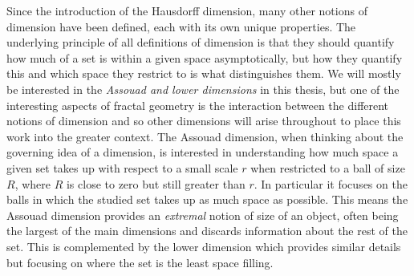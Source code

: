 Since the introduction of the Hausdorff dimension, many other notions of dimension have been defined, each with its own unique properties. The underlying principle of all definitions of dimension is that they should quantify how much of a set is within a given space asymptotically, but how they quantify this and which space they restrict to is what distinguishes them. We will mostly be interested in the \textit{Assouad and lower dimensions} in this thesis, but one of the interesting aspects of fractal geometry is the interaction between the different notions of dimension and so other dimensions will arise throughout to place this work into the greater context. The Assouad dimension, when thinking about the governing idea of a dimension, is interested in understanding how much space a given set takes up with respect to a small scale $r$ when restricted to a ball of size $R$, where $R$ is close to zero but still greater than $r$. In particular it focuses on the balls in which the studied set takes up as much space as possible. This means the Assouad dimension provides an \textit{extremal} notion of size of an object, often being the largest of the main dimensions and discards information about the rest of the set. This is complemented by the lower dimension which provides similar details but focusing on where the set is the least space filling.  




